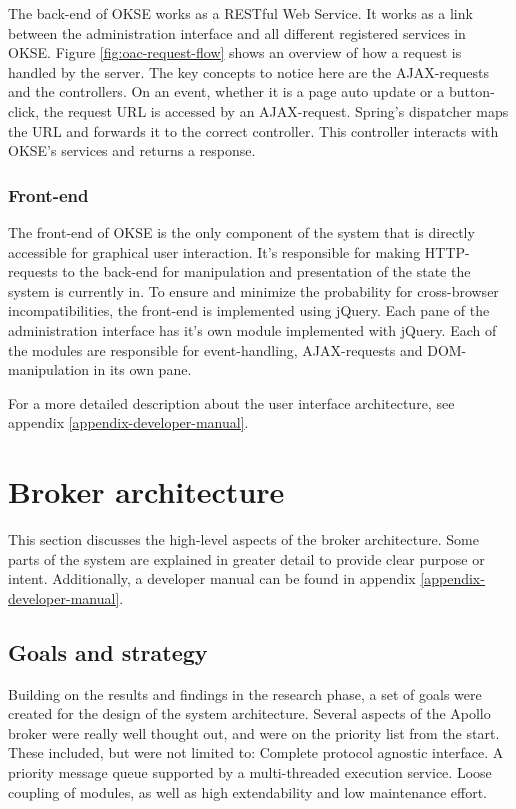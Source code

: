 The back-end of OKSE works as a RESTful Web Service. It works as a link between the administration interface and all different registered services in OKSE. Figure \ref{fig:oac-request-flow} shows an overview of how a request is handled by the server. The key concepts to notice here are the AJAX-requests and the controllers. On an event, whether it is a page auto update or a button-click, the request URL is accessed by an AJAX-request. Spring's dispatcher maps the URL and forwards it to the correct controller. This controller interacts with OKSE's services and returns a response. 

\subsubsection{Front-end}

The front-end of OKSE is the only component of the system that is directly accessible for graphical user interaction. It's responsible for making HTTP-requests to the back-end for manipulation and presentation of the state the system is currently in. To ensure and minimize the probability for cross-browser incompatibilities, the front-end is implemented using jQuery. Each pane of the administration interface has it's own module implemented with jQuery. Each of the modules are responsible for event-handling, AJAX-requests and DOM-manipulation in its own pane.  

For a more detailed description about the user interface architecture, see appendix \ref{appendix-developer-manual}.

\section{Broker architecture}
\label{sec:architecture_and_implementation-broker_architecture}

This section discusses the high-level aspects of the broker architecture. Some parts of the system are explained in greater detail to provide clear purpose or intent. Additionally, a developer manual can be found in appendix \ref{appendix-developer-manual}.

\subsection{Goals and strategy}
\label{subsec:architecture_and_implementation-broker_architecture-goals_and_strategy}

Building on the results and findings in the research phase, a set of goals were created for the design of the system architecture. Several aspects of the Apollo broker were really well thought out, and were on the priority list from the start. These included, but were not limited to: Complete protocol agnostic interface. A priority message queue supported by a multi-threaded execution service. Loose coupling of modules, as well as high extendability and low maintenance effort.

